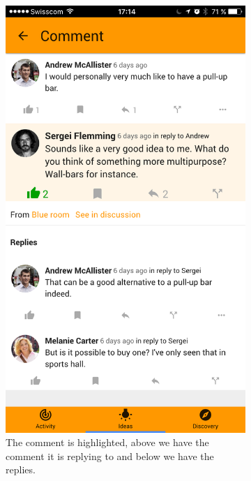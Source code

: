 \documentclass[a4paper,12pt, oneside]{article}
\begin{document}
\begin{figure}[!htb]
    \begin{subfigure}[t]{.48\textwidth}
        \centering
        \includegraphics[width=.67\textwidth]{images/commentView.png}
        \caption{The comment is highlighted, above we have the comment it is replying to and below we have the replies.}
        \label{fig.commentView}
    \end{subfigure}
    \hfill
    \begin{subfigure}[t]{.48\textwidth}
        \centering

\end{subfigure}
\end{figure}
\end{document}
